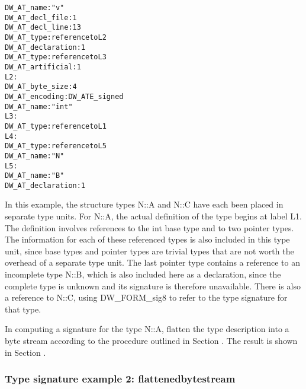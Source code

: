 \begin{alltt}
           DW\-\_AT\-\_name : "v"
           DW\-\_AT\-\_decl\-\_file : 1
           DW\-\_AT\-\_decl\-\_line : 13
           DW\-\_AT\-\_type : reference to L2
           DW\-\_AT\-\_declaration : 1
           DW\-\_AT\-\_type : reference to L3
           DW\-\_AT\-\_artificial : 1
L2:
         DW\-\_AT\-\_byte\-\_size : 4
         DW\-\_AT\-\_encoding : DW\-\_ATE\-\_signed
         DW\-\_AT\-\_name : "int"
L3:
         DW\-\_AT\-\_type : reference to L1
L4:
         DW\-\_AT\-\_type : reference to L5
         DW\-\_AT\-\_name : "N"
L5:
           DW\-\_AT\-\_name : "B"
           DW\-\_AT\-\_declaration : 1
\end{alltt}

In this example, the structure types N::A and N::C have each
been placed in separate type units.  For N::A, the actual
definition of the type begins at label L1. The definition
involves references to the int base type and to two pointer
types. The information for each of these referenced types is
also included in this type unit, since base types and pointer
types are trivial types that are not worth the overhead of a
separate type unit. The last pointer type contains a reference
to an incomplete type N::B, which is also included here as
a declaration, since the complete type is unknown and its
signature is therefore unavailable. There is also a reference
to N::C, using DW\-\_FORM\-\_sig8 to refer to the type signature
for that type.

In computing a signature for the type N::A, flatten the type
description into a byte stream according to the procedure
outlined in 
Section .
The result is shown in 
Section .

\subsubsection{Type signature example 2: flattenedbytestream}
\label{app:typesignatureexample2flattenedbytestream}

